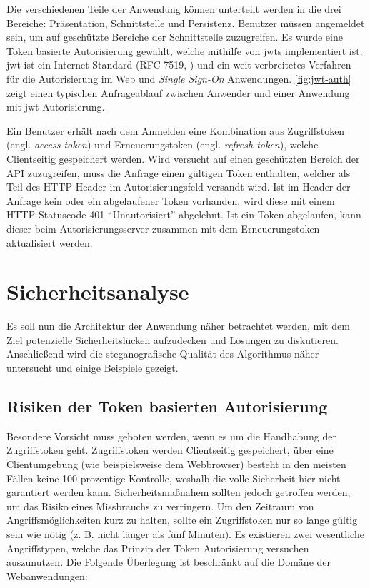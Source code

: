 \noindent
Die verschiedenen Teile der Anwendung können unterteilt werden in die
drei Bereiche: Präsentation, Schnittstelle und Persistenz.
Benutzer müssen angemeldet sein, um auf geschützte Bereiche der Schnittstelle zuzugreifen.
Es wurde eine Token basierte Autorisierung gewählt, welche mithilfe von \acp{jwt}
implementiert ist. \ac{jwt} ist ein Internet Standard (RFC 7519, \cite{SITE:jwt}) und ein
weit verbreitetes Verfahren für die Autorisierung im Web und \textit{Single Sign-On} Anwendungen.
\autoref{fig:jwt-auth} zeigt einen typischen Anfrageablauf zwischen Anwender und einer Anwendung
mit \acs{jwt} Autorisierung.
\newpage



\noindent
Ein Benutzer erhält nach dem Anmelden eine Kombination aus Zugriffstoken
(engl. \textit{access token}) und Erneuerungstoken (engl. \textit{refresh token}),
welche Clientseitig gespeichert werden.
Wird versucht auf einen geschützten Bereich der API zuzugreifen, muss die Anfrage
einen gültigen Token enthalten, welcher als Teil des HTTP-Header im
Autorisierungsfeld versandt wird.
Ist im Header der Anfrage kein oder ein
abgelaufener Token vorhanden, wird diese mit einem HTTP-Statuscode 401 \enquote{Unautorisiert}
abgelehnt. Ist ein Token abgelaufen, kann dieser beim Autorisierungsserver
zusammen mit dem Erneuerungstoken aktualisiert werden.

\section{Sicherheitsanalyse}
Es soll nun die Architektur der Anwendung näher betrachtet werden, mit dem Ziel
potenzielle Sicherheitslücken aufzudecken und Lösungen zu diskutieren.
Anschließend wird die steganografische Qualität des Algorithmus näher
untersucht und einige Beispiele gezeigt.

\subsection{Risiken der Token basierten Autorisierung}
Besondere Vorsicht muss geboten werden, wenn es um die Handhabung
der Zugriffstoken geht. Zugriffstoken werden Clientseitig gespeichert, über eine
Clientumgebung (wie beispielsweise dem Webbrowser) besteht in den meisten
Fällen keine 100-prozentige Kontrolle, weshalb die volle Sicherheit hier nicht
garantiert werden kann. Sicherheitsmaßnahem sollten jedoch getroffen werden, um
das Risiko eines Missbrauchs zu verringern.
Um den Zeitraum von Angriffsmöglichkeiten kurz zu halten, sollte
ein Zugriffstoken nur so lange gültig sein wie nötig
(z. B. nicht länger als fünf Minuten).
Es existieren zwei wesentliche Angriffstypen, welche das Prinzip der Token Autorisierung
versuchen auszunutzen. Die Folgende Überlegung ist beschränkt auf die Domäne
der Webanwendungen:

